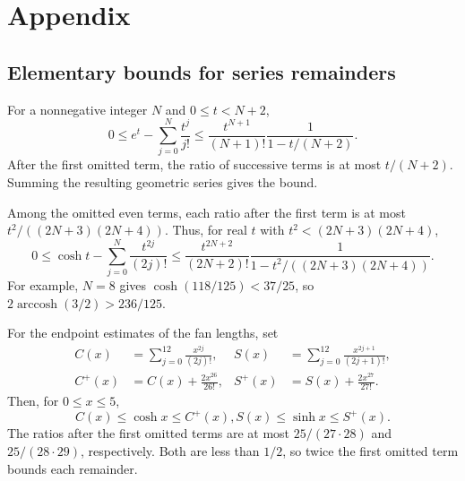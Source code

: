 \documentclass[10pt,twoside]{article}
\theoremstyle{plain}
\theoremstyle{definition}
\theoremstyle{remark}
\DeclareMathOperator{\arccosh}{arccosh}
\begin{document}
\appendix
\section*{Appendix}
\renewcommand{\thesubsection}{A\arabic{subsection}}
\renewcommand{\theHsubsection}{appendix.\arabic{subsection}}
\renewcommand{\theHsubsubsection}{\theHsubsection.\arabic{subsubsection}}
\renewcommand{\theHtheorem}{\theHsubsection.\arabic{theorem}}
\subsection{Elementary bounds for series remainders}
\label{app:series-estimates}

For a nonnegative integer $N$ and $0\leq t<N+2$,
\begin{equation}
\label{eq:exp-remainder}
0\leq e^t-\sum_{j=0}^{N}\frac{t^j}{j!}
\leq\frac{t^{N+1}}{(N+1)!}\frac1{1-t/(N+2)}.
\end{equation}
After the first omitted term, the ratio of successive terms is at
most $t/(N+2)$. Summing the resulting geometric series gives the bound.

Among the omitted even terms, each ratio after the first term is at most
$t^2/((2N+3)(2N+4))$. Thus, for real $t$ with
$t^2<(2N+3)(2N+4)$,
\begin{equation}
\label{eq:cosh-remainder}
0\leq\cosh t-\sum_{j=0}^{N}\frac{t^{2j}}{(2j)!}
\leq\frac{t^{2N+2}}{(2N+2)!}
\frac1{1-t^2/((2N+3)(2N+4))}.
\end{equation}
For example, $N=8$ gives $\cosh(118/125)<37/25$,
so $2\arccosh(3/2)>236/125$.

For the endpoint estimates of the fan lengths, set
$$
\begin{aligned}
C(x)&=\sum_{j=0}^{12}\frac{x^{2j}}{(2j)!},&
S(x)&=\sum_{j=0}^{12}\frac{x^{2j+1}}{(2j+1)!},\\
C^+(x)&=C(x)+\frac{2x^{26}}{26!},&
S^+(x)&=S(x)+\frac{2x^{27}}{27!}.
\end{aligned}
$$
Then, for $0\leq x\leq5$,
\begin{equation}
\label{eq:fan-series-bounds}
C(x)\leq\cosh x\leq C^+(x),
S(x)\leq\sinh x\leq S^+(x).
\end{equation}
The ratios after the first omitted terms are at most
$25/(27\cdot28)$ and $25/(28\cdot29)$, respectively. Both are
less than $1/2$, so twice the first omitted term bounds each remainder.
\end{document}
